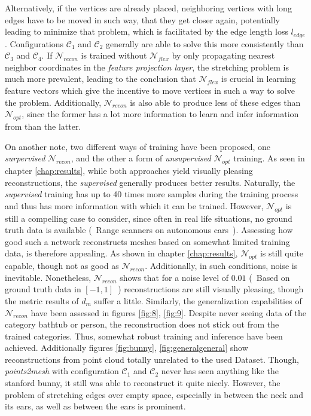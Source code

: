   Alternatively, if the vertices are already placed, neighboring vertices with long edges have to be moved in such way, that they get closer again, 
  potentially leading to minimize that problem, which is facilitated by the edge length loss $l_{edge}$.
  Configurations $\mathcal{C}_1$ and $\mathcal{C}_2$ generally are able to   solve this more consistently than $\mathcal{C}_3$ and $\mathcal{C}_4$. 
  If $\mathcal{N}_{recon}$ is trained without $\mathcal{N}_{flex}$ by only propagating nearest neighbor coordinates in the \emph{feature projection layer},
  the stretching problem is much more prevalent, leading to the conclusion that $\mathcal{N}_{flex}$ is crucial in learning feature vectors which give
  the incentive to move vertices in such a way to solve the problem.
  Additionally, $\mathcal{N}_{recon}$ is also able to produce less of these edges than $\mathcal{N}_{opt}$, since the former has a lot more information
  to learn and infer information from than the latter. 

  On another note, two different ways of training have been proposed, one \emph{surpervised} $\mathcal{N}_{recon}$, and the other a form of
  \emph{unsupervised} $\mathcal{N}_{opt}$ training. 
  As seen in chapter \ref{chap:results}, while both approaches yield visually pleasing reconstructions, the \emph{supervised} generally 
  produces better results. Naturally, the \emph{supervised} training has up to 40 times more samples during the training process and thus 
  has more information with which it can be trained. However, $\mathcal{N}_{opt}$ is still a compelling case to consider, since often in
  real life situations, no ground truth data is available (~Range scanners on autonomous cars~). Assessing how good such a network reconstructs
  meshes based on somewhat limited training data, is therefore appealing. As shown in chapter \ref{chap:results}, $\mathcal{N}_{opt}$ is still
  quite capable, though not as good as $\mathcal{N}_{recon}$. 
  Additionally, in such conditions, noise is inevitable. Nonetheless, $\mathcal{N}_{recon}$ shows that for a noise level of $0.01$ (~Based on ground 
  truth data in $[-1,1]$~) reconstructions are still visually pleasing, though the metric results of $d_m$ suffer a little. 
  Similarly, the generalization capabilities of $\mathcal{N}_{recon}$ have been assessed in figures \ref{fig:8}, \ref{fig:9}. Despite never seeing
  data of the category bathtub or person, the reconstruction does not stick out from the trained categories. Thus, somewhat robust training and inference have been achieved. 
  Additionally figures \ref{fig:bunny}, \ref{fig:generalgeneral} show reconstructions from point cloud totally unrelated to the used Dataset. Though, \emph{points2mesh}
  with configuration $\mathcal{C}_1$ and $\mathcal{C}_2$ never has seen anything like the stanford bunny, it still was able to reconstruct it quite nicely. However, the problem of stretching edges over empty space, especially in
  between the neck and its ears, as well as between the ears is prominent.



